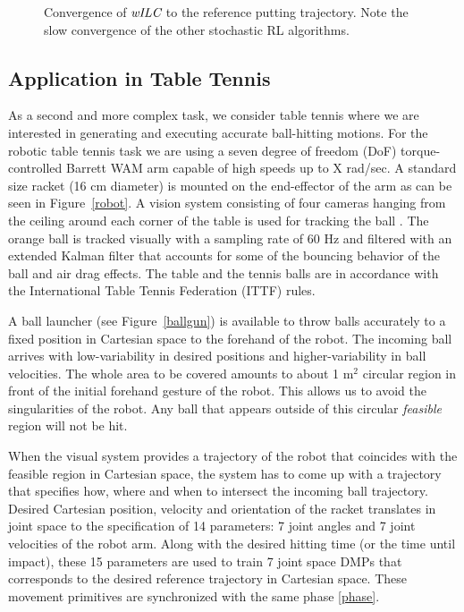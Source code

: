 
\begin{figure}
\center
\newlength\figureheight 
\newlength\figurewidth 
\setlength\figureheight{6cm}  
\setlength\figurewidth{6cm} 
\scalebox{1.0}{}
\caption{Convergence of $\emph{wILC}$ to the reference putting trajectory. Note the slow convergence of the other stochastic RL algorithms.}
\label{wILCTrajectoryPutting}
\end{figure}

\subsection{Application in Table Tennis}


As a second and more complex task, we consider table tennis where we are interested in generating and executing accurate ball-hitting motions. For the robotic table tennis task we are using a seven degree of freedom (DoF) torque-controlled Barrett WAM arm capable of high speeds up to X rad/sec. A standard size racket (16 cm diameter) is mounted on the end-effector of the arm as can be seen in Figure~\ref{robot}. A vision system consisting of four cameras hanging from the ceiling around each corner of the table is used for tracking the ball \cite{Lampert12}. The orange ball is tracked  visually with a sampling rate of 60 Hz and filtered with an extended Kalman filter that accounts for some of the bouncing behavior of the ball and air drag effects. The table and the tennis balls are in accordance with the International Table Tennis Federation (ITTF) rules.

A ball launcher (see Figure~\ref{ballgun}) is available to throw balls accurately to a fixed position in Cartesian space to the forehand of the robot. The incoming ball arrives with low-variability in desired positions and higher-variability in ball velocities. The whole area to be covered amounts to about 1 m$^2$ circular region in front of the initial forehand gesture of the robot. This allows us to avoid the singularities of the robot. Any ball that appears outside of this circular \emph{feasible} region will not be hit.

When the visual system provides a trajectory of the robot that coincides with the feasible region in Cartesian space, the system has to come up with a trajectory that specifies how, where and when to intersect the incoming ball trajectory. Desired Cartesian position, velocity and orientation of the racket translates in joint space to the specification of 14 parameters: 7 joint angles and 7 joint velocities of the robot arm. Along with the desired hitting time (or the time until impact), these 15 parameters are used to train 7 joint space DMPs that corresponds to the desired reference trajectory in Cartesian space. These movement primitives are synchronized with the same phase \eqref{phase}.


